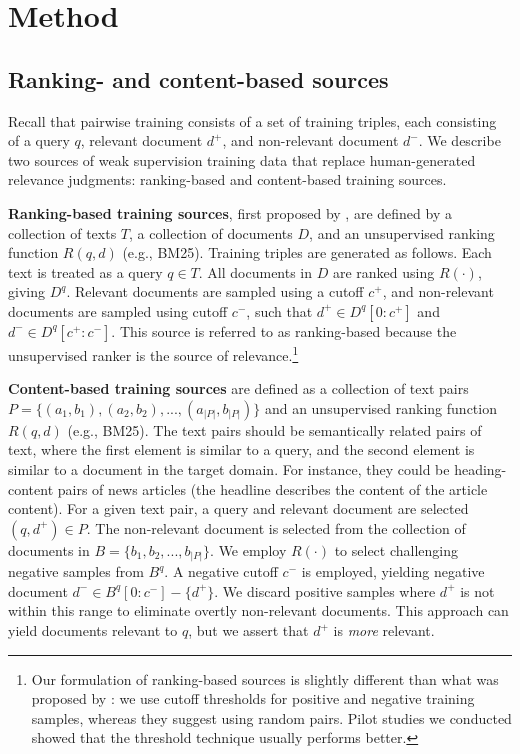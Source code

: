 \section{Method} 
\label{sec.method}

\subsection{Ranking- and content-based sources}\label{sec.source}

Recall that pairwise training consists of a set of training triples, each consisting of a query $q$, relevant document $d^+$, and non-relevant document $d^-$. We describe two sources of weak supervision training data that replace human-generated relevance judgments: ranking-based and content-based training sources.

\textbf{Ranking-based training sources}, first proposed by \cite{dehghani2017neural}, are defined by a collection of texts $T$, a collection of documents $D$, and an unsupervised ranking function $R(q,d)$ (e.g., BM25). Training triples are generated as follows. Each text is treated as a query $q\in T$. All documents in $D$ are ranked using $R(\cdot)$, giving $D^q$. Relevant documents are sampled using a cutoff $c^+$, and non-relevant documents are sampled using cutoff $c^-$, such that $d^+\in D^q[0:c^+]$ and $d^-\in D^q[c^+:c^-]$. This source is referred to as ranking-based because the unsupervised ranker is the source of relevance.\footnote{Our formulation of ranking-based sources is slightly different than what was proposed by \citet{dehghani2017neural}: we use cutoff thresholds for positive and negative training samples, whereas they suggest using random pairs. Pilot studies we conducted showed that the threshold technique usually performs better.}

\textbf{Content-based training sources} are defined as a collection of text pairs $P=\{(a_1,b_1),(a_2,b_2),...,(a_{|P|},b_{|P|})\}$ and an unsupervised ranking function $R(q,d)$ (e.g., BM25). The text pairs should be semantically related pairs of text, where the first element is similar to a query, and the second element is similar to a document in the target domain. For instance, they could be heading-content pairs of news articles (the headline describes the content of the article content). For a given text pair, a query and relevant document are selected $(q,d^+)\in P$. The non-relevant document is selected from the collection of documents in $B=\{b_1,b_2,...,b_{|P|}\}$. We employ $R(\cdot)$ to select challenging negative samples from $B^q$. A negative cutoff $c^-$ is employed, yielding negative document $d^-\in B^q[0:c^-]-\{d^+\}$. We discard positive samples where $d^+$ is not within this range to eliminate overtly non-relevant documents. This approach can yield documents relevant to $q$, but we assert that $d^+$ is \textit{more} relevant.


